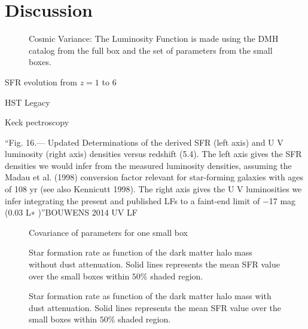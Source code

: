 \section{Discussion}

\begin{figure}
\caption{Cosmic Variance: The Luminosity Function is made using the DMH catalog 
from the full box and the set of parameters from the small boxes.}
\label{graph_cosmic_variance}
\end{figure}

\citep{lundgren14} SFR evolution from $z=1$ to $6$

\citep{bouwens14} HST Legacy

\citep{jiang11} Keck pectroscopy


``Fig. 16.— Updated Determinations of the derived SFR (left axis) and U V
luminosity (right axis) densities versus redshift (5.4). The
left axis gives the SFR densities we would infer from the measured luminosity
densities, assuming the Madau et al. (1998) conversion
factor relevant for star-forming galaxies with ages of 108 yr (see also
Kennicutt 1998). The right axis gives the U V luminosities we infer
integrating the present and published LFs to a faint-end limit of −17 mag (0.03
L∗ )''BOUWENS 2014 UV LF

\begin{figure}
\caption{Covariance of parameters for one small box}
\label{graph_scattering_plots}
\end{figure}




\begin{figure}
\caption{Star formation rate as function of the dark matter halo mass without dust attenuation. 
Solid lines represents the mean SFR value over the small boxes within $50\%$  shaded region. }
\label{graph_SFR_DMHM_wo}
\end{figure}

\begin{figure}
\caption{Star formation rate as function of the dark matter halo mass with dust attenuation. 
Solid lines represents the mean SFR value over the small boxes within $50\%$  shaded region. }
\label{graph_SFR_DMHM_w}
\end{figure}